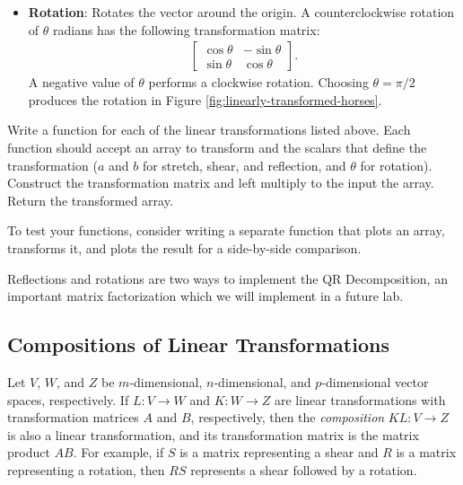 \begin{itemize}
\item \textbf{Rotation}: %
Rotates the vector around the origin.
A counterclockwise rotation of $\theta$ radians has the following transformation matrix:
%
\begin{align*}
\left[\begin{array}{rr}
\cos\theta & -\sin\theta\\
\sin\theta &  \cos\theta
\end{array}\right].
\end{align*}
%
A negative value of $\theta$ performs a clockwise rotation.
Choosing $\theta = \pi/2$ produces the rotation in Figure \ref{fig:linearly-transformed-horses}.

\end{itemize}

\begin{problem} %
Write a function for each of the linear transformations listed above.
Each function should accept an array to transform and the scalars that define the transformation ($a$ and $b$ for stretch, shear, and reflection, and $\theta$ for rotation).
Construct the transformation matrix and left multiply to the input the array.
Return the transformed array.

To test your functions, consider writing a separate function that plots an array, transforms it, and plots the result for a side-by-side comparison.
\end{problem}

\begin{info} %
Reflections and rotations are two ways to implement the QR Decomposition, an important matrix factorization which we will implement in a future lab. %
\end{info}

\subsection*{Compositions of Linear Transformations} %

Let $V$, $W$, and $Z$ be $m$-dimensional, $n$-dimensional, and $p$-dimensional vector spaces, respectively.
If $L:V\rightarrow W$ and $K:W\rightarrow Z$ are linear transformations with transformation matrices $A$ and $B$, respectively, then the \emph{composition} $KL:V\rightarrow Z$ is also a linear transformation, and its transformation matrix is the matrix product $AB$.
For example, if $S$ is a matrix representing a shear and $R$ is a matrix representing a rotation, then $RS$ represents a shear followed by a rotation.


